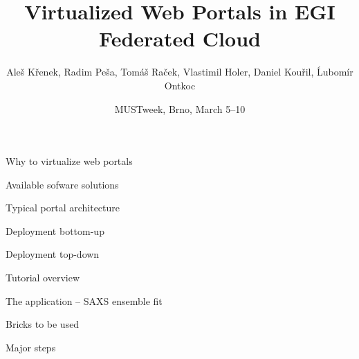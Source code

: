 \documentclass[smaller,t]{beamer}
\begin{document}
\makeatletter

\title{Virtualized Web Portals in EGI \\[\smallskipamount] Federated Cloud}
\date{MUSTweek, Brno, March 5--10}
\author[A. Křenek et al.]{Aleš Křenek, Radim Peša, Tomáš Raček, Vlastimil Holer, Daniel Kouřil, Ĺubomír Ontkoc}
\begin{frame}
\maketitle
\end{frame}

\begin{frame}{Why to virtualize web portals}

\end{frame}

\begin{frame}{Available sofware solutions}

\end{frame}

\begin{frame}{Typical portal architecture}

\end{frame}

\begin{frame}{Deployment bottom-up}

\end{frame}

\begin{frame}{Deployment top-down}

\end{frame}

\begin{frame}{Tutorial overview}

\end{frame}

\begin{frame}{The application -- SAXS ensemble fit}

\end{frame}

\begin{frame}{Bricks to be used}

\end{frame}

\begin{frame}{Major steps}

\end{frame}
\end{document}
